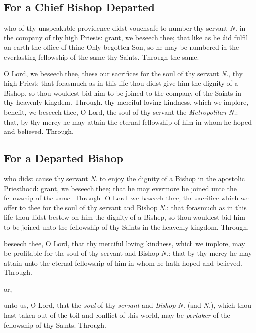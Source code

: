 \begin{multicols}{2}
\subsection{For a Chief Bishop Departed}\label{RequiemPrayers}
\collect
{} who of thy unspeakable providence didst vouchsafe to number thy servant \textit{N.} in the company of thy high Priests: grant, we beseech thee; that like as he did fulfil on earth the office of thine Only-begotten Son, so he may be numbered in the everlasting fellowship of the same thy Saints. Through the same.

\secret
{} O Lord, we beseech thee, these our sacrifices for the soul of thy servant \textit{N.}, thy high Priest: that forasmuch as in this life thou didst give him the dignity of a Bishop, so thou wouldest bid him to be joined to the company of the Saints in thy heavenly kingdom. Through.
\postcommunion%
 thy merciful loving-kindness, which we implore, benefit, we beseech thee, O Lord, the soul of thy servant the \textit{Metropolitan} \textit{N.}: that, by thy mercy he may attain the eternal fellowship of him in whom he hoped and believed. Through.

\subsection{For a Departed Bishop}
\collect
{} who didst cause thy servant \textit{N.} to enjoy the dignity of a Bishop in the apostolic Priesthood: grant, we beseech thee; that he may evermore be joined unto the fellowship of the same. Through.
\secret
{} O Lord, we beseech thee, the sacrifice which we offer to thee for the soul of thy servant and Bishop \textit{N.}: that forasmuch as in this life thou didst bestow on him the dignity of a Bishop, so thou wouldest bid him to be joined unto the fellowship of thy Saints in the heavenly kingdom. Through.

   \newcolumn

\postcommunion
{} beseech thee, O Lord, that thy merciful loving kindness, which we implore, may be profitable for the soul of thy servant and Bishop \textit{N.}: that by thy mercy he may attain unto the eternal fellowship of him in whom he hath hoped and believed. Through.
\begin{inhead}
or,
\end{inhead}
\vspace{-1\baselineskip}
\collect
{} unto us, O Lord, that the \textit{soul} of thy \textit{servant} and \textit{Bishop} \textit{N.} (and \textit{N.}), which thou hast taken out of the toil and conflict of this world, may be \textit{partaker} of the fellowship of thy Saints. Through.



\end{multicols}

